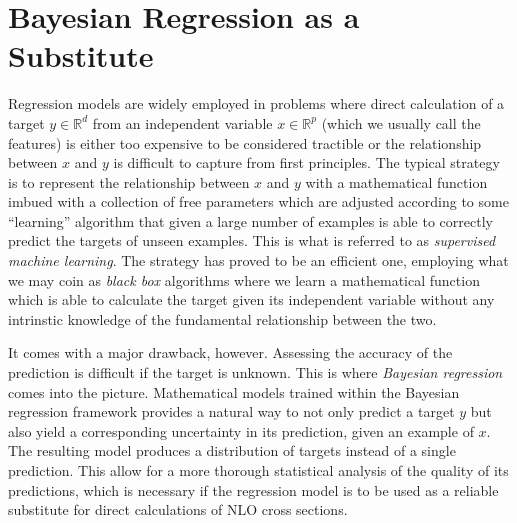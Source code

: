 \section{Bayesian Regression as a Substitute}
Regression models are widely employed in problems where direct calculation of a target $y \in \mathbb{R}^d$ from an independent variable $x \in \mathbb{R}^p$ (which we usually call the features) is either too expensive to be considered tractible or the relationship between $x$ and $y$ is difficult to capture from first principles. The typical strategy is to represent the relationship between $x$ and $y$ with a mathematical function imbued with a collection of free parameters which are adjusted according to some ``learning'' algorithm that given a large number of examples is able to correctly predict the targets of unseen examples. This is what is referred to as \textit{supervised machine learning}. The strategy has proved to be an efficient one, employing what we may coin as \textit{black box} algorithms where we learn a mathematical function which is able to calculate the target given its independent variable without any intrinstic knowledge of the fundamental relationship between the two. 

It comes with a major drawback, however. Assessing the accuracy of the prediction is difficult if the target is unknown. This is where \textit{Bayesian regression} comes into the picture. Mathematical models trained within the Bayesian regression framework provides a natural way to not only predict a target $y$ but also yield a corresponding uncertainty in its prediction, given an example of $x$.
The resulting model produces a distribution of targets instead of a single prediction. This allow for a more thorough statistical analysis of the quality of its predictions, which is necessary if the regression model is to be used as a reliable substitute for direct calculations of NLO cross sections.

